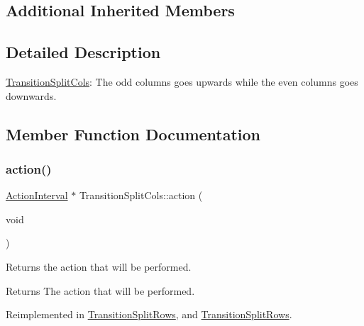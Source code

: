 \subsection*{Additional Inherited Members}


\subsection{Detailed Description}
\hyperlink{classTransitionSplitCols}{Transition\+Split\+Cols}\+: The odd columns goes upwards while the even columns goes downwards. 

\subsection{Member Function Documentation}
\mbox{\label{classTransitionSplitCols_a8b6074132330415cb925e15378363462}} 
\subsubsection{\texorpdfstring{action()}{action()}\hspace{0.1cm}{\footnotesize\ttfamily [1/2]}}
{\footnotesize\ttfamily \hyperlink{classActionInterval}{Action\+Interval} $\ast$ Transition\+Split\+Cols\+::action (\begin{DoxyParamCaption}\item[{void}]{ }\end{DoxyParamCaption})\hspace{0.3cm}{\ttfamily [virtual]}}

Returns the action that will be performed.

\begin{DoxyReturn}{Returns}
The action that will be performed. 
\end{DoxyReturn}


Reimplemented in \hyperlink{classTransitionSplitRows_ac24473a717ed730485921a329dc9c5de}{Transition\+Split\+Rows}, and \hyperlink{classTransitionSplitRows_acd330cd9bde2c1fb7d3da21befa5918e}{Transition\+Split\+Rows}.

\mbox{\label{classTransitionSplitCols_aade19b41200d84779b305e1a6062898a}} 
